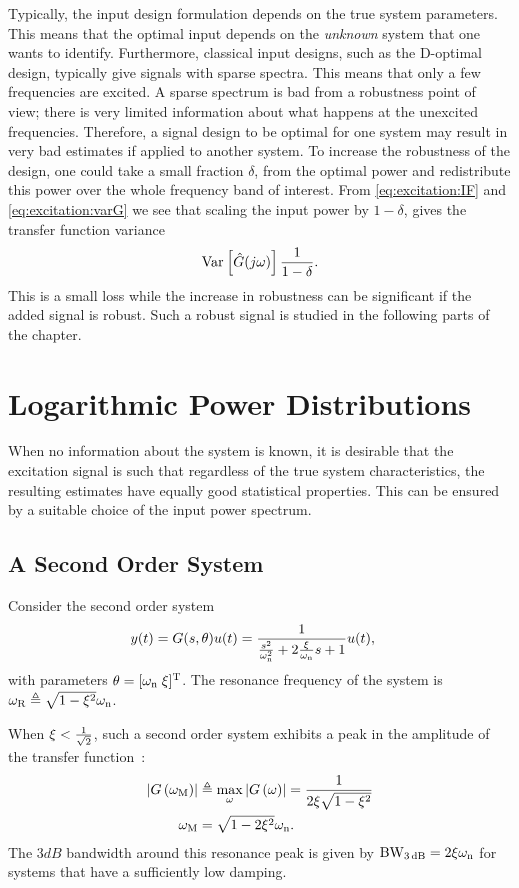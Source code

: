 Typically, the input design formulation depends on the true system parameters. This means that the optimal input depends on the \emph{unknown} system that one wants to identify. 
Furthermore, classical input designs, such as the D-optimal design, typically give signals with sparse spectra. 
This means that only a few frequencies are excited. 
A sparse spectrum is bad from a robustness point of view; there is very limited information about what happens at the unexcited frequencies. 
Therefore, a signal design to be optimal for one system may result in very bad estimates if applied to another system.
To increase the robustness of the design, one could take a small fraction $\delta$, from the optimal power and redistribute this power over the whole frequency band of interest.
From \eqref{eq:excitation:IF} and \eqref{eq:excitation:varG} we see that scaling the input power by $1-\delta$, gives the transfer function variance
\begin{align}
\operatorname{\mathrm{Var}}_{} \left[ \hat{G}(j\omega) \right]\frac{1}{1-\delta}.
\end{align}
This is a small loss while the increase in robustness can be significant if the added signal is robust. Such a robust signal is studied in the following parts of the chapter.

\section{Logarithmic Power Distributions}
\label{sec:excitation:logarithmic}
When no information about the system is known, it is desirable that the excitation signal is such that regardless of the true system characteristics, the resulting estimates have equally good statistical properties.
This can be ensured by a suitable choice of the input power spectrum.

 \subsection{A Second Order System}
Consider the second order system
\begin{align}
y(t) 
  &= 
  G(s,\theta) u(t) 
  = \frac{1}
                {\frac{s^2}{\omega_{\mathrm{n}}^2} + 2\frac{\xi_{}}{\omega_{\mathrm{n}}}s + 1}
      u(t),
\label{eq:excitation:2ndOrderSys}
\end{align}
with parameters $\theta=[\omega_{\mathrm{n}}\;\xi_{}]^{\mathrm{T}}$. 
The resonance frequency of the system is $\omega_{\mathrm{R}} \triangleq \sqrt{1-\xi_{}^2}\omega_{\mathrm{n}}$.
  
When $\xi_{} < \frac{1}{\sqrt{2}}$, such a second order system exhibits a peak in the amplitude of the transfer function~\citep{Oppenheim1983}:
  \begin{align}
   \left| G\left(\omega_{\mathrm{M}} \right)  \right|
   & \triangleq
          \max_{\omega} 
            \left| G\left( \omega \right) \right|  
        = \frac{1}
               {2 \xi_{} \sqrt{1-\xi_{}^2}}
               \label{eq:excitation:peakAmplitude}\\
   \omega_{\mathrm{M}} &
        = \sqrt{1-2\xi_{}^2} \omega_{\mathrm{n}}
        \label{eq:excitation:peakFrequency}
    \text{.}
  \end{align}
  The $3\unit{dB}$ bandwidth around this resonance peak is given by $\mathrm{BW}_{3\,\mathrm{dB}} = 2\xi_{}\omega_{\mathrm{n}}$ for systems that have a sufficiently low damping.

